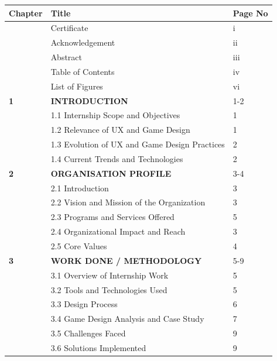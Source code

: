\documentclass[15pt,a4paper,twocolumn,fleqn]{article}
\begin{document}
\begin{center}
\begin{tabular}{p{3.5cm} p{9cm} p{2.5cm}}
\textbf{Chapter} & \textbf{Title} & \textbf{Page No} \\
\hline

& Certificate & i \\
& Acknowledgement & ii \\
& Abstract & iii \\
& Table of Contents & iv \\
& List of Figures & vi \\

\textbf{1} & \textbf{INTRODUCTION} & 1-2 \\
& 1.1 Internship Scope and Objectives & 1 \\
& 1.2 Relevance of UX and Game Design & 1 \\
& 1.3 Evolution of UX and Game Design Practices & 2 \\
& 1.4 Current Trends and Technologies & 2 \\

\textbf{2} & \textbf{ORGANISATION PROFILE} & 3-4 \\
& 2.1 Introduction & 3 \\
& 2.2 Vision and Mission of the Organization & 3 \\
& 2.3 Programs and Services Offered & 5 \\
& 2.4 Organizational Impact and Reach & 3 \\
& 2.5 Core Values & 4 \\

\textbf{3} & \textbf{WORK DONE / METHODOLOGY} & 5-9 \\
& 3.1 Overview of Internship Work & 5 \\
& 3.2 Tools and Technologies Used & 5 \\
& 3.3 Design Process & 6 \\
& 3.4 Game Design Analysis and Case Study & 7 \\
& 3.5 Challenges Faced & 9 \\
& 3.6 Solutions Implemented & 9 \\
\end{tabular}
\end{center}

\newpage
\end{document}
